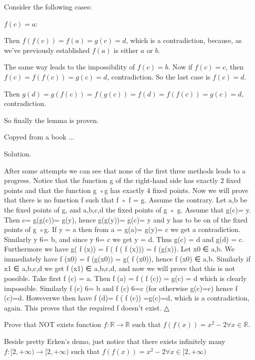\begin{solution}
Consider the following cases:

$ f(c)=a$:

Then $ f(f(c))=f(a)=g(c) = d$, which is a contradiction, because, as we've previously established $ f(a)$ is either $ a$ or $ b$. 

The same way leads to the impossibility of $ f(c)=b$. Now if $ f(c)=c$, then $ f(c)=f(f(c))=g(c)=d$, contradiction. So the last case is $ f(c)=d$.

Then $ g(d)=g(f(c))=f(g(c))=f(d)=f(f(c))=g(c)=d$, contradiction.

So finally the lemma is proven.
\end{solution}



\begin{solution}
	Copyed from a book ...

\begin{bolded}Solution.\end{bolded} After some attempts we can see that none of the first three methods leads to a progress.
Notice that the function g of the right-hand side has exactly 2 fixed points and that the function g ◦g
has exactly 4 fixed points. Now we will prove that there is no function f such that f ◦ f = g. Assume
the contrary. Let a,b be the fixed points of g, and a,b,c,d the fixed points of g ◦ g. Assume that
g(c)= y. Then c= g(g(c))= g(y), hence g(g(y))= g(c)= y and y has to be on of the fixed points of
g ◦g. If y = a then from a = g(a)= g(y)= c we get a contradiction. Similarly y 6= b, and since y 6= c
we get y = d. Thus g(c) = d and g(d) = c. Furthermore we have g( f (x)) = f ( f ( f (x))) = f (g(x)).
Let x0 ∈ {a,b}. We immediately have f (x0) = f (g(x0)) = g( f (x0)), hence f (x0) ∈ {a,b}. Similarly
if x1 ∈ {a,b,c,d} we get f (x1) ∈ {a,b,c,d}, and now we will prove that this is not possible. Take
first f (c) = a. Then f (a) = f ( f (c)) = g(c) = d which is clearly impossible. Similarly f (c) 6= b and
f (c) 6=c (for otherwise g(c)=c) hence f (c)=d. Howeverwe then have f (d)= f ( f (c)) =g(c)=d,
which is a contradiction, again. This proves that the required f doesn’t exist. △
\end{solution}



\begin{solution}
	\begin{tcolorbox}Prove that NOT exists function $ f: \mathbb R\to\mathbb R$ such that $ f(f(x)) = x^{2} - 2\forall x\in\mathbb R$.\end{tcolorbox}

Beside pretty Erken's demo, just notice that there exists infinitely many $ f: [2,+\infty)\to[2,+\infty)$ such that $ f(f(x)) = x^{2} - 2\forall x\in[2,+\infty)$
\end{solution}




